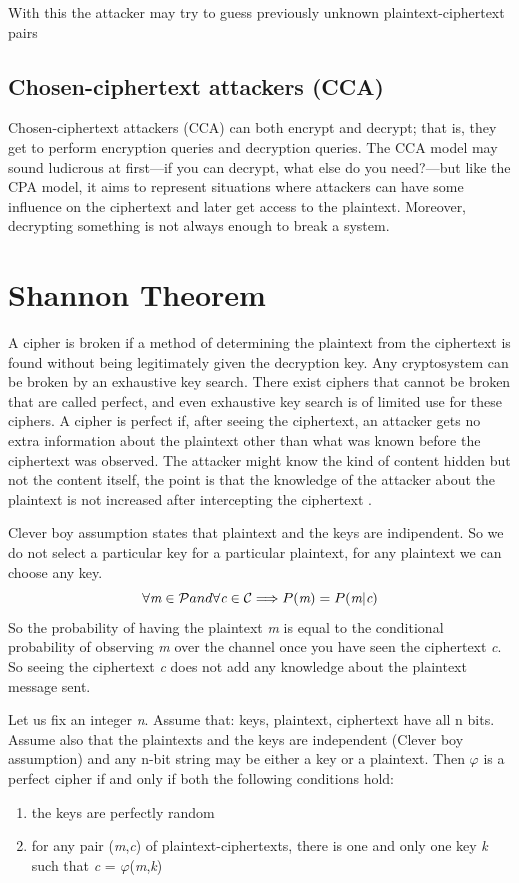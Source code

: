 	With this the attacker may try to guess previously unknown plaintext-ciphertext pairs
	
	
	\subsection{Chosen-ciphertext attackers (CCA)}
	Chosen-ciphertext attackers (CCA) can both encrypt and decrypt; that is, they get to perform encryption queries and decryption queries. The CCA model may sound ludicrous at first—if you can decrypt, what else do you need?—but like the CPA model, it aims to represent situations where attackers can have some influence on the ciphertext and later get access to the plaintext. Moreover, decrypting something is not always enough to break a system.
	

\section{Shannon Theorem}

A cipher is broken if a method of determining the plaintext from the ciphertext is found without being legitimately given the decryption key. Any cryptosystem can be broken by an exhaustive key search. There exist ciphers that cannot be broken that are called perfect, and even exhaustive key search is of limited use for these ciphers.
A cipher is perfect if, after seeing the ciphertext, an attacker gets no extra information about the plaintext other than what was known before the ciphertext was observed. The attacker might know the kind of content hidden but not the content itself, the point is that the knowledge of the attacker about the plaintext is not increased after intercepting the ciphertext . 

Clever boy assumption states that plaintext and the keys are indipendent. So we do not select a particular key for a particular plaintext, for any plaintext we can choose any key.
$$\forall\emph{m}\in\mathcal{P} and \forall\emph{c}\in\mathcal{C} \Longrightarrow P(\emph{m}) = P(\emph{m}|\emph{c}) $$
So the probability of having the plaintext \emph{m} is equal to the conditional probability of observing \emph{m} over the channel once you have seen the ciphertext \emph{c}. So seeing the ciphertext \emph{c} does not add any knowledge about the plaintext message sent.

Let us fix an integer \emph{n}. Assume that: keys, plaintext, ciphertext have all n bits. Assume also that the plaintexts and the keys are independent (Clever boy assumption) and any n-bit string may be either a key or a plaintext. Then $\varphi$ is a perfect cipher if and only if both the following conditions hold:
\begin{enumerate}
	\item the keys are perfectly random
	\item for any pair (\emph{m},\emph{c}) of plaintext-ciphertexts, there is one and only one key \emph{k} such that \emph{c} = $\varphi$(\emph{m},\emph{k})
\end{enumerate}

